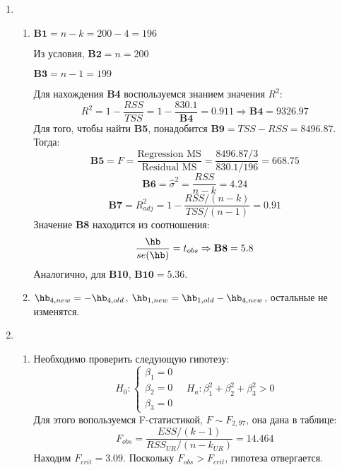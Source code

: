 \documentclass[12pt, a4paper]{article}
\theoremstyle{definition}
\begin{document}
\begin{enumerate}
\item
\begin{enumerate}
  \item
$\textbf{B1} = n - k = 200 - 4 = 196$

Из условия, $\textbf{B2} = n = 200$

$\textbf{B3} = n - 1  = 199$

Для нахождения \textbf{B4} воспользуемся знанием значения $R^2$:
\[
R^2 = 1 - \frac{RSS}{TSS} = 1 - \frac{830.1}{\textbf{B4}} = 0.911 \Rightarrow \textbf{B4} = 9326.97
\]
Для того, чтобы найти \textbf{B5}, понадобится $\textbf{B9} = TSS - RSS = 8496.87$. Тогда:
\[
\textbf{B5} = F = \frac{\text{Regression MS}}{\text{Residual MS}} = \frac{8496.87/3}{830.1/196} = 668.75
\]
\[
\textbf{B6} = \hat{\sigma}^2 = \frac{RSS}{n-k} = 4.24
\]
\[
\textbf{B7} = R^2_{adj} = 1 - \frac{RSS/(n-k)}{TSS/(n-1)} = 0.91
\]
Значение \textbf{B8} находится из соотношения:
\[
\frac{\hb}{se(\hb)} = t_{obs} \Rightarrow \textbf{B8} = 5.8
\]
Аналогично, для \textbf{B10}, $\textbf{B10} = 5.36$.

\item  $\hb_{4, new} = -\hb_{4, old}$, $\hb_{1, new} = \hb_{1, old} - \hb_{4, new}$, остальные не изменятся.
\end{enumerate}
\item
\begin{enumerate}
\item Необходимо проверить следующую гипотезу:
\[
H_0: \begin{cases}
\beta_1 = 0 \\
\beta_2 = 0 \\
\beta_3 = 0
\end{cases}
\quad
H_a: \beta_1^2 + \beta_2^2 + \beta_3^2 >0
\]
Для этого вопользуемся F-статистикой, $F \sim F_{2,97}$, она дана в таблице:
\[
F_{obs} = \frac{ESS/(k-1)}{RSS_{UR}/(n-k_{UR})} = 14.464
\]
Находим $F_{crit} = 3.09$. Поскольку $F_{obs} > F_{crit}$, гипотеза отвергается.


\end{enumerate}
\end{enumerate}
\end{document}
